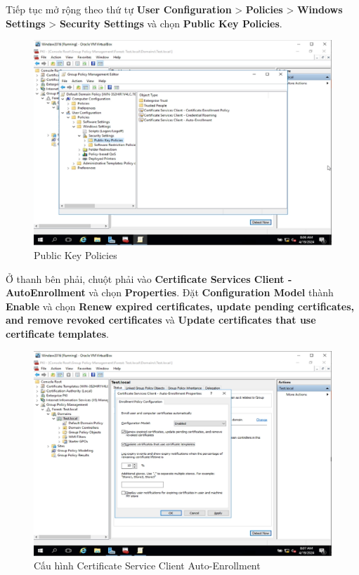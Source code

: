Tiếp tục mở rộng theo thứ tự \textbf{User Configuration } > \textbf{Policies} > \textbf{Windows Settings} > \textbf{Security Settings} và chọn \textbf{Public Key Policies}.

\begin{figure}[!htb]
    \centering
    \includegraphics[width=0.8\linewidth]{figure//chapter4//lab4_3/public_key_policies.png}
    \caption{Public Key Policies}
    \label{fig:enter-label}
\end{figure}

Ở thanh bên phải, chuột phải vào \textbf{Certificate Services Client -  AutoEnrollment} và chọn \textbf{Properties}. Đặt \textbf{Configuration Model} thành \textbf{Enable} và chọn \textbf{Renew expired certificates, update pending certificates, and remove revoked certificates} và \textbf{Update certificates that use certificate templates}.

\begin{figure}[!htb]
    \centering
    \includegraphics[width=0.8\linewidth]{figure//chapter4//lab4_3/cert_service_client_autoenrollment.png}
    \caption{Cấu hình Certificate Service Client Auto-Enrollment}
    \label{fig:enter-label}
\end{figure}

